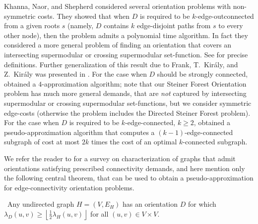 \documentclass[envcountsame]{llncs}
\begin{document}
Khanna, Naor, and Shepherd \cite{KNS} considered several orientation problems with non-symmetric costs.
They showed that when $D$ is required to be $k$-edge-outconnected from a given roots $s$
(namely, $D$ contains $k$ edge-disjoint paths from $s$ to every other node),
then the problem admits a polynomial time algorithm.
In fact they considered a more general problem of finding an orientation that covers 
an intersecting supermodular or crossing supermodular set-function.
See \cite{KNS} for precise definitions. Further generalization of this result due to 
Frank, T.~Kir\'{a}ly, and Z.~Kir\'{a}ly was presented in \cite{FKK}.
For the case when $D$ should be strongly connected, \cite{KNS} obtained 
a $4$-approximation algorithm; note that our {\sf Steiner Forest Orientation} problem 
has much more general demands, that are {\em not} captured by  
intersecting supermodular or crossing supermodular set-functions, but we 
consider symmetric edge-costs (otherwise the problem includes the {\sf Directed Steiner Forest} problem). 
For the case when $D$ is required to be 
$k$-edge-connected, $k \geq 2$, \cite{KNS} obtained a pseudo-approximation algorithm 
that computes a $(k-1)$-edge-connected subgraph of cost at most $2k$ times the cost 
of an optimal $k$-connected subgraph.

We refer the reader to \cite{FK} for a survey on characterization of graphs that admit orientations satisfying 
prescribed connectivity demands, and here mention only 
the following central theorem,
that can be used to obtain a pseudo-approximation for edge-connectivity orientation problems.

\begin{theorem}  \label{t:NW} \ 
Any undirected graph $H=(V,E_H)$ has an orientation $D$ for which
$\lambda_D(u,v) \geq \left\lfloor \frac{1}{2} \lambda_H(u,v) \right\rfloor$
for all $(u,v) \in V \times V$. 
\end{theorem}
\end{document}
